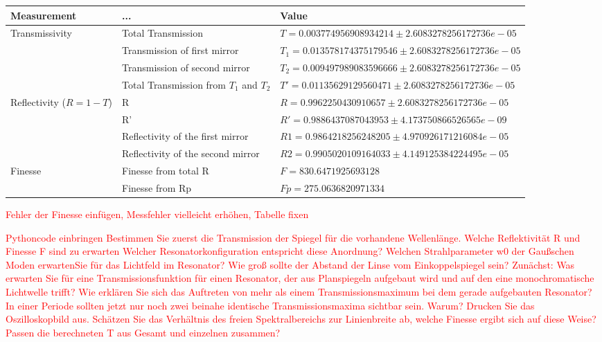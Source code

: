 \documentclass{article}
\begin{document}
\begin{tabular}{|p{3cm}|p{3cm}|p{6cm}|}
\hline
Measurement & ... & Value \\
\hline
\multirow{1}{*}{Transmissivity}
        &Total Transmission & $T= 0.003774956908934214 \pm 2.6083278256172736e-05$\\
        &Transmission of first mirror & $T_{1}= 0.013578174375179546 \pm 2.6083278256172736e-05$\\
        &Transmission of second mirror & $T_{2}= 0.009497989083596666 \pm 2.6083278256172736e-05$\\
        &Total Transmission from $T_{1}$ and $T_{2}$& $T' = 0.01135629129560471 \pm 2.6083278256172736e-05$\\
\hline
\multirow{1}{*}{Reflectivity ($R=1-T$)}
        & R  &$R=  0.9962250430910657 \pm 2.6083278256172736e-05$\\
        & R' &$R'=  0.9886437087043953 \pm 4.173750866526565e-09$\\
        & Reflectivity of the first mirror &$ R1=  0.9864218256248205 \pm 4.970926171216084e-05$\\
        & Reflectivity of the second mirror  &$R2=  0.9905020109164033 \pm 4.149125384224495e-05$\\
\hline
\multirow{1}{*}{Finesse}
        & Finesse from total R & $F= 830.6471925693128$\\
        & Finesse from Rp & $Fp = 275.0636820971334$ \\
\hline
\end{tabular} %

\textcolor{red}{Fehler der Finesse einfügen, Messfehler vielleicht erhöhen, Tabelle fixen} %

\textcolor{red}{
Pythoncode einbringen
Bestimmen Sie zuerst die Transmission der Spiegel für die vorhandene Wellenlänge. Welche
Reflektivität R und Finesse F sind zu erwarten
Welcher Resonatorkonfiguration entspricht diese Anordnung? Welchen Strahlparameter w0 der Gaußschen Moden erwartenSie für das Lichtfeld im Resonator? Wie groß sollte der Abstand der Linse vom Einkoppelspiegel sein?
Zunächst: Was erwarten Sie für eine Transmissionsfunktion für einen Resonator, der aus Planspiegeln aufgebaut wird und auf den eine monochromatische Lichtwelle trifft? Wie erklären Sie sich das Auftreten von mehr als einem Transmissionsmaximum bei dem gerade aufgebauten Resonator? \\
In einer Periode sollten jetzt nur noch zwei beinahe identische Transmissionsmaxima sichtbar sein. Warum? Drucken Sie das Oszilloskopbild aus. Schätzen Sie das Verhältnis des freien Spektralbereichs zur Linienbreite ab, welche Finesse ergibt sich auf diese Weise? Passen die berechneten T aus Gesamt und einzelnen zusammen?}\\
\end{document}
